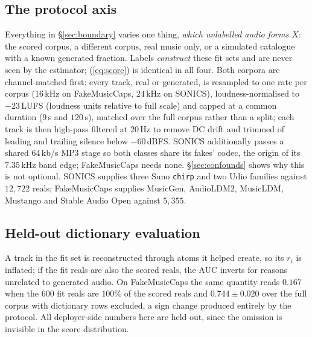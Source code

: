 \documentclass{article}
\begin{document}
\subsection{The protocol axis}
Everything in \S\ref{sec:boundary} varies one thing, \emph{which unlabelled audio
forms $X$}: the scored corpus, a different corpus, real music only, or a simulated
catalogue with a known generated fraction. Labels \emph{construct} these fit sets
and are never seen by the estimator; (\ref{eq:score}) is identical in all four. Both corpora are channel-matched first: every track, real or generated, is
resampled to one rate per corpus ($16$\,kHz on FakeMusicCaps, $24$\,kHz
on SONICS), loudness-normalised to $-23$\,LUFS (loudness units relative to full
scale) and capped at a common duration ($9$\,s and $120$\,s), matched over the full
corpus rather than a split; each track is then high-pass filtered at $20$\,Hz to
remove DC drift and trimmed of leading and trailing silence below $-60$\,dBFS.
SONICS additionally passes a shared $64$\,kb/s MP3
stage so both classes share its fakes' codec, the origin of its $7.35$\,kHz band edge;
FakeMusicCaps needs none. \S\ref{sec:confounds} shows why this is not
optional. SONICS supplies three Suno \texttt{chirp} and two Udio families against
$12{,}722$ reals;
FakeMusicCaps supplies MusicGen, AudioLDM2, MusicLDM, Mustango and Stable Audio Open
against $5{,}355$.

\subsection{Held-out dictionary evaluation}
\label{ssec:holdout}
A track in the fit set is reconstructed through atoms it helped create, so its
$r_i$ is inflated; if the fit reals are also the scored reals, the AUC inverts for
reasons unrelated to generated audio. On
FakeMusicCaps the same quantity reads $0.167$ when the $600$ fit reals are
$100\%$ of the scored reals and $0.744 \pm 0.020$ over the full corpus with
dictionary rows excluded, a sign change produced entirely by the protocol.
All deployer-side numbers here are held out, since the omission is invisible in the
score distribution.
\end{document}
